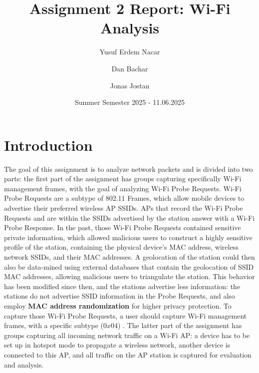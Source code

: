 \documentclass[sigconf,nonacm]{acmart}
\begin{document}
\title{Assignment 2 Report: Wi-Fi Analysis}
\author{Yusuf Erdem Nacar}
\author{Dan Bachar}
\author{Jonas Jostan}
\date{Summer Semester 2025 - 11.06.2025}

\maketitle


\section{Introduction}
\label{sec:intro}
The goal of this assignment is to analyze network packets and is divided into two parts: the first part of the assignment has groups capturing specifically Wi-Fi management frames, with the goal of analyzing Wi-Fi Probe Requests. Wi-Fi Probe Requests are a subtype of 802.11 Frames, which allow mobile devices to advertise their preferred wireless AP SSIDs. APs that record the Wi-Fi Probe Requests and are within the SSIDs advertised by the station answer with a Wi-Fi Probe Response. In the past, those Wi-Fi Probe Requests contained sensitive private information, which allowed malicious users to construct a highly sensitive profile of the station, containing the physical device's MAC address, wireless network SSIDs, and their MAC addresses. A geolocation of the station could then also be data-mined using external databases that contain the geolocation of SSID MAC addresses, allowing malicious users to triangulate the station. This behavior has been modified since then, and the stations advertise less information: the stations do not advertise SSID information in the Probe Requests, and also employ \textbf{MAC address randomization }\cite{cisco2022rcm} for higher privacy protection. To capture those Wi-Fi Probe Requests, a user should capture Wi-Fi management frames, with a specific subtype ($0x04$) \cite{cisco-probe-requests}. The latter part of the assignment has groups capturing all incoming network traffic on a Wi-Fi AP: a device has to be set up in hotspot mode to propagate a wireless network, another device is connected to this AP, and all traffic on the AP station is captured for evaluation and analysis.
\end{document}
